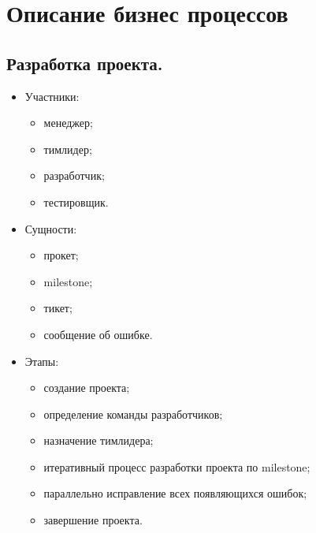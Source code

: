 \section{Описание бизнес процессов}
	\subsection{Разработка проекта.}
	\begin{itemize}
		\item Участники:
		\begin{itemize}
			\item менеджер;
			\item тимлидер;
			\item разработчик;
			\item тестировщик.
		\end{itemize}
		\item Сущности:
		\begin{itemize}
			\item прокет;
			\item milestone;
			\item тикет;
			\item сообщение об ошибке.
		\end{itemize}
		\item Этапы:
		\begin{itemize}
			\item создание проекта;
			\item определение команды разработчиков;
			\item назначение тимлидера;
			\item итеративный процесс разработки проекта по milestone;
			\item параллельно исправление всех появляющихся ошибок;
			\item завершение проекта.
		\end{itemize}
	\end{itemize}
	

